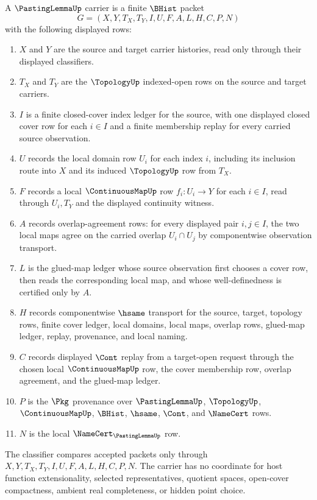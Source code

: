 \begin{definition}
\label{def:pasting-lemma-carrier}
A $\PastingLemmaUp$ carrier is a finite $\BHist$ packet
$$
G=(X,Y,T_X,T_Y,I,U,F,A,L,H,C,P,N)
$$
with the following displayed rows:
\begin{enumerate}
\item $X$ and $Y$ are the source and target carrier histories, read only through their displayed classifiers.
\item $T_X$ and $T_Y$ are the $\TopologyUp$ indexed-open rows on the source and target carriers.
\item $I$ is a finite closed-cover index ledger for the source, with one displayed closed cover row for each $i\in I$ and a finite membership replay for every carried source observation.
\item $U$ records the local domain row $U_i$ for each index $i$, including its inclusion route into $X$ and its induced $\TopologyUp$ row from $T_X$.
\item $F$ records a local $\ContinuousMapUp$ row $f_i:U_i\to Y$ for each $i\in I$, read through $U_i,T_Y$ and the displayed continuity witness.
\item $A$ records overlap-agreement rows: for every displayed pair $i,j\in I$, the two local maps agree on the carried overlap $U_i\cap U_j$ by componentwise observation transport.
\item $L$ is the glued-map ledger whose source observation first chooses a cover row, then reads the corresponding local map, and whose well-definedness is certified only by $A$.
\item $H$ records componentwise $\hsame$ transport for the source, target, topology rows, finite cover ledger, local domains, local maps, overlap rows, glued-map ledger, replay, provenance, and local naming.
\item $C$ records displayed $\Cont$ replay from a target-open request through the chosen local $\ContinuousMapUp$ row, the cover membership row, overlap agreement, and the glued-map ledger.
\item $P$ is the $\Pkg$ provenance over $\PastingLemmaUp$, $\TopologyUp$, $\ContinuousMapUp$, $\BHist$, $\hsame$, $\Cont$, and $\NameCert$ rows.
\item $N$ is the local $\NameCert_{\PastingLemmaUp}$ row.
\end{enumerate}
The classifier compares accepted packets only through $X,Y,T_X,T_Y,I,U,F,A,L,H,C,P,N$. The carrier has no coordinate for host function extensionality, selected representatives, quotient spaces, open-cover compactness, ambient real completeness, or hidden point choice.
\end{definition}

